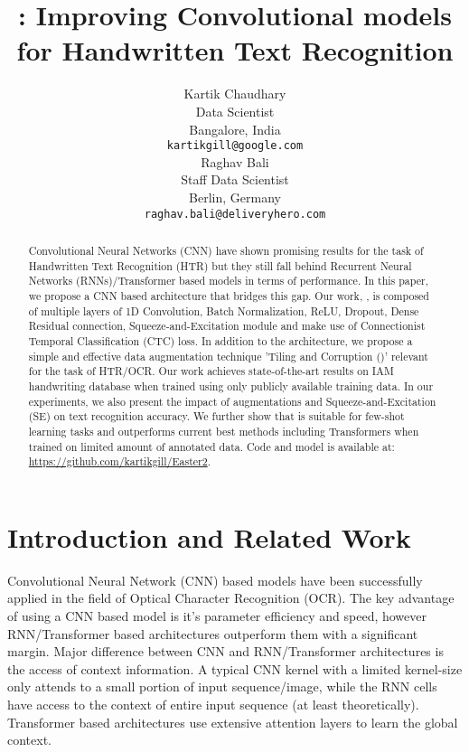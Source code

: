 \documentclass{article}
\title{: Improving Convolutional models for Handwritten Text Recognition
}
\author{
  Kartik Chaudhary\\
  Data Scientist \\
  Bangalore, India\\
  \texttt{kartikgill@google.com} \\
\And
  Raghav Bali \\
  Staff Data Scientist \\
  Berlin, Germany\\
  \texttt{raghav.bali@deliveryhero.com} \\
}
\begin{document}
\maketitle


\begin{abstract}
Convolutional Neural Networks (CNN) have shown promising results for the task of Handwritten Text Recognition (HTR) but they still fall behind Recurrent Neural Networks (RNNs)/Transformer based models in terms of performance. In this paper, we propose a CNN based architecture that bridges this gap. Our work, , is composed of multiple layers of 1D Convolution, Batch Normalization, ReLU, Dropout, Dense Residual connection, Squeeze-and-Excitation module and make use of Connectionist Temporal Classification (CTC) loss. In addition to the  architecture, we propose a simple and effective data augmentation technique 'Tiling and Corruption ()' relevant for the task of HTR/OCR. Our work achieves state-of-the-art results on IAM handwriting database when trained using only publicly available training data. In our experiments, we also present the impact of  augmentations and Squeeze-and-Excitation (SE) on text recognition accuracy. We further show that  is suitable for few-shot learning tasks and outperforms current best methods including Transformers when trained on limited amount of annotated data. Code and model is available at: \url{https://github.com/kartikgill/Easter2}.
\end{abstract}



\section{Introduction and Related Work}
Convolutional Neural Network (CNN) based models have been successfully applied in the field of Optical Character Recognition (OCR)\cite{Chaudhary2021EASTER,ingle2019scalable,bluche2017gated,ptucha2019intelligent,yousef2020accurate,chollet2017xception}. The key advantage of using a CNN based model is it's parameter efficiency and speed, however RNN/Transformer based architectures outperform them with a significant margin\cite{kang2020pay,diaz2021rethinking,li2021trocr,michael2019evaluating,pham2014dropout,voigtlaender2016handwriting}. Major difference between CNN and RNN/Transformer architectures is the access of context information. A typical CNN kernel with a limited kernel-size only attends to a small portion of input sequence/image, while the RNN cells have access to the context of entire input sequence (at least theoretically). Transformer based architectures use extensive attention layers to learn the global context. 
\end{document}
